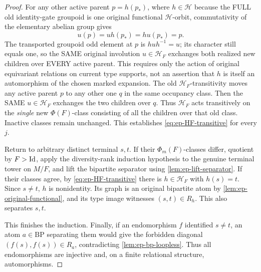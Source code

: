 \begin{proof}
For any other active parent
\(p=h(p_*)\), where \(h\in\mathscr H\)
because the FULL old identity-gate
groupoid is one original functional
\(\mathscr H\)-orbit, commutativity
of the elementary abelian group gives
\[
                 u(p)=u h(p_*)=
                      h u(p_*)=p.
\]
The transported groupoid odd element
at \(p\) is \(huh^{-1}=u\);
its character still equals one, so
the SAME original involution \(u\in
\mathscr H_F\) exchanges both realized
new children over EVERY active parent.
This requires only the action of original
equivariant relations on current type
supports, not an assertion that \(h\)
is itself an automorphism of the chosen
marked expansion.
The old \(\mathscr H_F\)-transitivity moves
any active parent \(p\) to any other one
\(q\) in the same occupancy class.
Then the SAME \(u\in\mathscr H_F\)
exchanges the two children over \(q\).
Thus \(\mathscr H_F\) acts transitively on
the \emph{single} new \(\Phi(F)\)-class
consisting of all the children over that
old class. Inactive classes remain unchanged.
This establishes \eqref{eq:ep-HF-transitive}
for every \(j\).

Return to arbitrary distinct terminal \(s,t\).
If their \(\Phi_m(F)\)-classes differ,
quotient by \(F>\mathrm{Id}\), apply the diversity-rank
induction hypothesis to the genuine terminal
tower on \(M/F\), and lift the bipartite
separator using \cref{lem:ep-lift-separator}.
If their classes agree, by
\eqref{eq:ep-HF-transitive} there is
\(h\in\mathscr H_F\) with \(h(s)=t\).
Since \(s\ne t\), \(h\) is nonidentity.
Its graph is an original bipartite atom
by \cref{lem:ep-original-functional},
and its type image witnesses
\((s,t)\in R_h\). This also separates \(s,t\).

This finishes the induction. Finally, if
an endomorphism \(f\) identified \(s\ne t\),
an atom \(a\in\mathrm{BP}\) separating them
would give the forbidden diagonal
\((f(s),f(s))\in R_a\), contradicting
\cref{lem:ep-bp-loopless}.
Thus all endomorphisms are injective and,
on a finite relational structure, automorphisms.
\end{proof}

